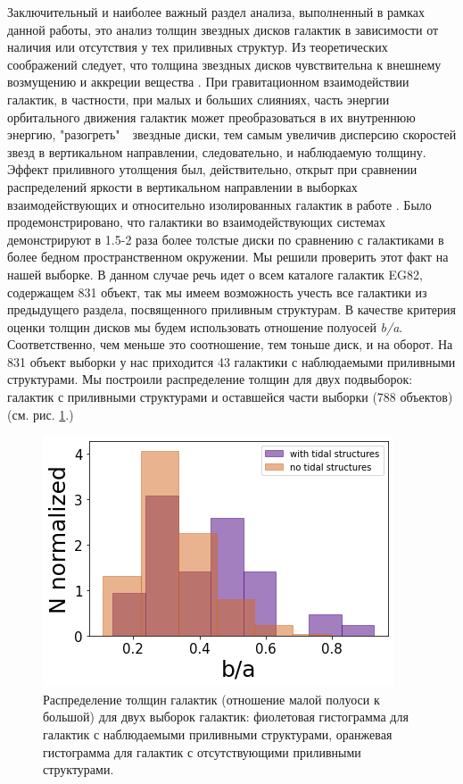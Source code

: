 Заключительный и наиболее важный раздел анализа, выполненный в рамках данной работы, это анализ толщин звездных дисков галактик в зависимости от наличия или отсутствия у тех приливных структур. Из теоретических соображений следует, что толщина звездных дисков чувствительна к внешнему возмущению и аккреции вещества \cite{1992ApJ...389....5T}. При гравитационном взаимодействии галактик, в частности, при малых и больших слияниях, часть энергии орбитального движения галактик может преобразоваться в их внутреннюю энергию, "разогреть"$\textrm{ }$ звездные диски, тем самым увеличив дисперсию скоростей звезд в вертикальном направлении, следовательно, и наблюдаемую толщину. Эффект приливного утолщения был, действительно, открыт при сравнении распределений яркости в вертикальном направлении в выборках взаимодействующих и относительно изолированных галактик в работе \citep{1997A&A...324...80R}. Было продемонстрировано, что галактики во взаимодействующих системах демонстрируют в 1.5-2 раза более толстые диски по сравнению с галактиками в более бедном пространственном окружении. Мы решили проверить этот факт на нашей выборке. В данном случае речь идет о всем каталоге галактик EG82, содержащем 831 объект, так мы имеем возможность учесть все галактики из предыдущего раздела, посвященного приливным структурам. В качестве критерия оценки толщин дисков мы будем использовать отношение полуосей \textit{b/a}. Соответственно, чем меньше это соотношение, тем тоньше диск, и на оборот. На 831 объект выборки у нас приходится 43 галактики с наблюдаемыми приливными структурами. Мы построили распределение толщин для двух подвыборок: галактик с приливными структурами и оставшейся части выборки (788 объектов) (см. рис. \ref{fig:b_a}.) 
\begin{figure}[th]
    \centering
    \includegraphics[width=.8\textwidth]{plot_results/b_a.png}
    \caption{Распределение толщин галактик (отношение малой полуоси к большой) для двух выборок галактик: фиолетовая гистограмма для галактик с наблюдаемыми приливными структурами, оранжевая гистограмма для галактик с отсутствующими приливными структурами.}\label{fig:b_a} 
\end{figure}

